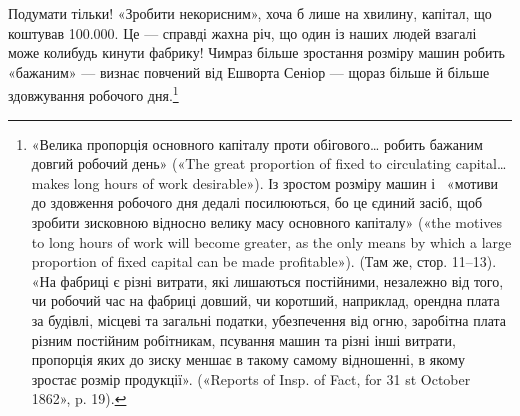 Подумати тільки! «Зробити некорисним», хоча б лише на хвилину,
капітал, що коштував \num{100.000}. Це — справді
жахна річ, що один із наших людей взагалі може колибудь кинути
фабрику! Чимраз більше зростання розміру машин робить «бажаним»
— визнає повчений від Ешворта Сеніор — щораз більше
й більше здовжування робочого дня.\footnote{
«Велика пропорція основного капіталу проти обігового\dots{} робить
бажаним довгий робочий день» («The great proportion of fixed to circulating
capital\dots{} makes long hours of work desirable»). Із зростом розміру
машин і~ «мотиви до здовження робочого дня дедалі посилюються,
бо це єдиний засіб, щоб зробити зисковною відносно велику масу основного
капіталу» («the motives to long hours of work will become greater,
as the only means by which a large proportion of fixed capital can be
made profitable»). (Там же, стор. 11--13). «На фабриці є різні витрати,
які лишаються постійними, незалежно від того, чи робочий час на
фабриці довший, чи коротший, наприклад, орендна плата за будівлі, місцеві
та загальні податки, убезпечення від огню, заробітна плата різним
постійним робітникам, псування машин та різні інші витрати, пропорція
яких до зиску меншає в такому самому відношенні, в якому
зростає розмір продукції». («Reports of Insp. of Fact, for 31 st October
1862», p. 19).
}
